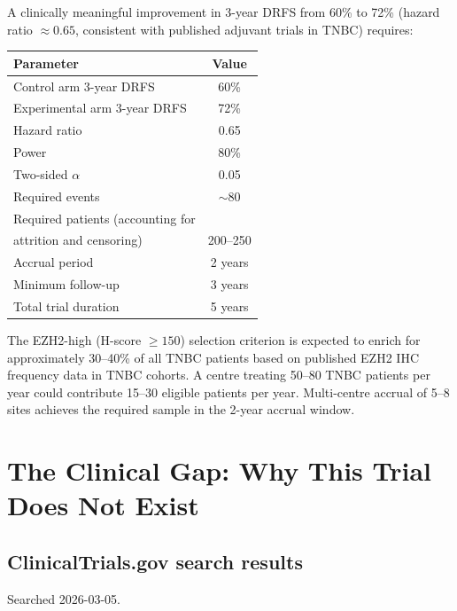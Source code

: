 \documentclass[12pt, a4paper]{article}
\begin{document}
A clinically meaningful improvement in 3-year
DRFS from 60\% to 72\% (hazard ratio $\approx 0.65$,
consistent with published adjuvant trials in TNBC)
requires:

\begin{center}
\begin{tabular}{lc}
\toprule
\textbf{Parameter} & \textbf{Value} \\
\midrule
Control arm 3-year DRFS & 60\% \\
Experimental arm 3-year DRFS & 72\% \\
Hazard ratio & 0.65 \\
Power & 80\% \\
Two-sided $\alpha$ & 0.05 \\
Required events & $\sim$80 \\
Required patients (accounting for\\
attrition and censoring) & 200--250 \\
Accrual period & 2 years \\
Minimum follow-up & 3 years \\
Total trial duration & 5 years \\
\bottomrule
\end{tabular}
\end{center}

\noindent The EZH2-high (H-score $\geq150$) selection
criterion is expected to enrich for approximately
30--40\% of all TNBC patients based on published
EZH2 IHC frequency data in TNBC cohorts. A centre
treating 50--80 TNBC patients per year could
contribute 15--30 eligible patients per year.
Multi-centre accrual of 5--8 sites achieves the
required sample in the 2-year accrual window.

\section{The Clinical Gap: Why This Trial Does Not Exist}

\subsection{ClinicalTrials.gov search results}

Searched 2026-03-05.
\end{document}
